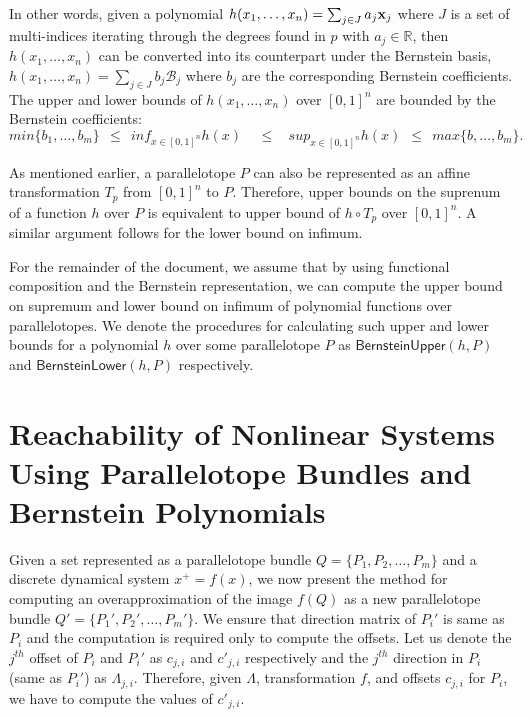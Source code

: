 \documentclass[EPiC]{easychair}
\begin{document}
In other words, given a polynomial $h(x_1,\ldots,x_n) = \sum_{j \in J} a_j {\bf x}_{j}$ where $J$ is a set of multi-indices iterating through the degrees found in $p$ with $a_j \in \mathbb{R}$, then $h(x_1,\ldots,x_n)$ can be converted into its counterpart under the Bernstein basis, $h(x_1,\ldots,x_n) = \sum_{j \in J} b_j \mathcal{B}_j $ where $b_j$ are the corresponding Bernstein coefficients. 
%
The upper and lower bounds of $h(x_1,\ldots,x_n)$ over $[0,1]^n$ are bounded by the Bernstein coefficients:
$$
min \{b_1, \ldots, b_m\} ~~\leq~~ inf_{x \in [0,1]^n} h(x) ~~~~~\leq~~~~ sup_{x \in [0,1]^{n}} h(x) ~~\leq~~ max \{b, \ldots, b_m\}.
$$

As mentioned earlier, a parallelotope $P$ can also be represented as an affine transformation $T_{p}$ from $[0,1]^{n}$ to $P$. 
%
Therefore, upper bounds on the suprenum of a function $h$ over $P$ is equivalent to upper bound of $h \circ T_{p}$ over $[0,1]^{n}$.
%
A similar argument follows for the lower bound on infimum.
%


For the remainder of the document, we assume that by using functional composition and the Bernstein representation, we can compute the upper bound on supremum and lower bound on infimum of polynomial functions over parallelotopes.
%
We denote the procedures for calculating such upper and lower bounds for a polynomial $h$ over some parallelotope $P$ as $\mathsf{BernsteinUpper}(h,P)$ and $\mathsf{BernsteinLower}(h,P)$ respectively. 

\section{Reachability of Nonlinear Systems Using Parallelotope Bundles and Bernstein Polynomials}

Given a set represented as a parallelotope bundle $Q = \{P_1, P_2, \ldots, P_m\}$ and a discrete dynamical system $x^{+} = f(x)$, we now present the method for computing an overapproximation of the image $f(Q)$ as a new parallelotope bundle $Q' = \{P_1', P_2', \ldots, P_m'\}$.
%
We ensure that direction matrix of $P_i'$ is same as $P_i$ and the computation is required only to compute the offsets. 
%
Let us denote the $j^{th}$ offset of $P_i$ and $P_i'$ as $c_{j,i}$ and $c'_{j,i}$ respectively and the $j^{th}$ direction in $P_i$ (same as $P_i'$) as $\Lambda_{j,i}$.
%
Therefore, given $\Lambda$, transformation $f$, and offsets $c_{j,i}$ for $P_i$, we have to compute the values of $c'_{j,i}$.
\end{document}
